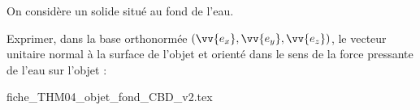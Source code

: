 \newpage




\hauteurLargeurCadreReponse		{8mm}{3cm}
\initialisationEntrainement

                                \initialisationPartieGauche %

On considère un solide situé au fond de l'eau. 




Exprimer, dans la base orthonormée $(\vv{e_x},\vv{e_y},\vv{e_z})$, le vecteur unitaire normal à la surface de l'objet et 
 orienté dans le sens de la force pressante de l'eau sur l'objet :


                                \initialisationPartieDroite %
\def\ratioScaleImage{1.7}

\begin{center}
{fiche_THM04_objet_fond_CBD_v2.tex}
\end{center}

